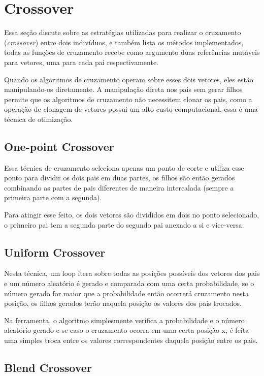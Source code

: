 \documentclass[12pt]{article}
\begin{document}
\section{Crossover}

Essa seção discute sobre as estratégias utilizadas para realizar o cruzamento (\textit{crossover}) entre dois indivíduos, e também lista
os métodos implementados, todas as funções de cruzamento recebe como argumento duas referências mutáveis para vetores, uma para 
cada pai respectivamente. 

Quando os algoritmos de cruzamento operam sobre esses dois vetores, eles estão manipulando-os 
diretamente. A manipulação direta nos pais sem gerar filhos permite que os algoritmos de 
cruzamento não necessitem clonar os pais, como a operação de clonagem de vetores 
possui um alto custo computacional, essa é uma técnica de otimização.

\subsection{One-point Crossover}

Essa técnica de cruzamento seleciona apenas um ponto de corte e utiliza esse ponto para dividir os dois 
pais em duas partes, os filhos são então gerados combinando as partes de pais diferentes de maneira 
intercalada (sempre a primeira parte com a segunda).

Para atingir esse feito, os dois vetores são divididos em dois no ponto selecionado, o primeiro pai tem a segunda parte do segundo 
pai anexado a si e vice-versa.

\subsection{Uniform Crossover}

Nesta técnica, um loop itera sobre todas as posições possíveis dos vetores dos pais e um número aleatório
é gerado e comparada com uma certa probabilidade, se o número gerado for maior que a probabilidade então 
ocorrerá cruzamento nesta posição, os filhos gerados terão naquela posição os valores dos pais trocados.

Na ferramenta, o algoritmo simplesmente verifica a probabilidade e o número aleatório gerado e se caso 
o cruzamento ocorra em uma certa posição x, é feita uma simples troca entre os valores correspondentes 
daquela posição entre os pais.

\subsection{Blend Crossover}
\end{document}
